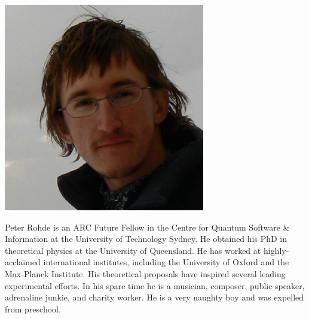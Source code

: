 \documentclass[aps,prl,twocolumn,amsmath,amssymb,nofootinbib,superscriptaddress]{revtex4}
\begin{document}
\includegraphics[width=\columnwidth]{photo_peter_rohde}

Peter Rohde is an ARC Future Fellow in the Centre for Quantum Software \& Information at the University of Technology Sydney. He obtained his PhD in theoretical physics at the University of Queensland. He has worked at highly-acclaimed international institutes, including the University of Oxford and the Max-Planck Institute. His theoretical proposals have inspired several leading experimental efforts. In his spare time he is a musician, composer, public speaker, adrenaline junkie, and charity worker. He is a very naughty boy and was expelled from preschool.
\end{document}

